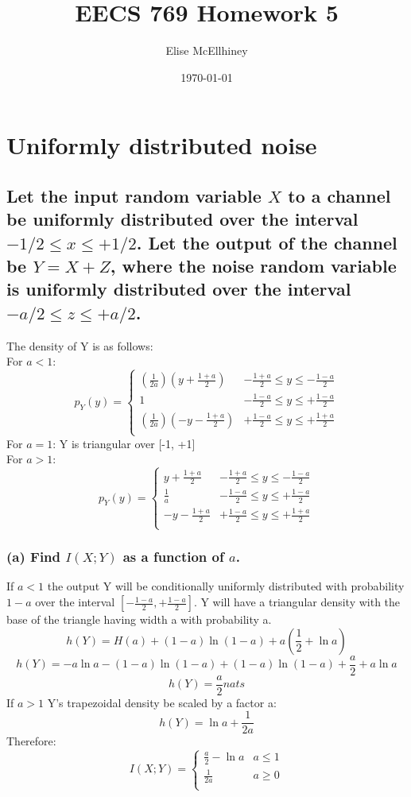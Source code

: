 \documentclass[11pt, oneside]{book}   	%
\title{EECS 769 Homework 5}
\author{Elise McEllhiney}
\date{\today}							%
\begin{document}
\maketitle

\section{Uniformly distributed noise}
\subsection*{Let the input random variable $X$ to a channel be uniformly distributed over the interval $-1/2 \leq x \leq +1/2$.  Let the output of the channel be $Y = X + Z$, where the noise random variable is uniformly distributed over the interval $-a/2 \leq z \leq +a/2$.}
The density of Y is as follows:\\
For $a < 1$:
\[ p_Y(y) =
  \begin{cases} 
      (\frac{1}{2a})(y+\frac{1+a}{2}) & -\frac{1+a}{2} \leq y \leq -\frac{1-a}{2} \\
      1 & -\frac{1-a}{2} \leq y \leq +\frac{1-a}{2} \\
      (\frac{1}{2a})(-y-\frac{1+a}{2}) & +\frac{1-a}{2} \leq y \leq +\frac{1+a}{2} \\
   \end{cases}
\]
For $a = 1$: Y is triangular over [-1, +1]\\
For $a>1$:
\[ p_Y(y) =
  \begin{cases} 
      y+\frac{1+a}{2} & -\frac{1+a}{2} \leq y \leq -\frac{1-a}{2} \\
      \frac{1}{a} & -\frac{1-a}{2} \leq y \leq +\frac{1-a}{2} \\
      -y-\frac{1+a}{2} & +\frac{1-a}{2} \leq y \leq +\frac{1+a}{2} \\
   \end{cases}
\]

\subsubsection{(a) Find $I(X;Y)$ as a function of $a$.}
If $a<1$ the output Y will be conditionally uniformly distributed with probability $1-a$ over the interval $[-\frac{1-a}{2}, +\frac{1-a}{2}]$.  Y will have a triangular density with the base of the triangle having width a with probability a.
$$h(Y) = H(a) + (1-a)\ln(1-a)+a(\frac{1}{2}+\ln{a})$$
$$h(Y) = -a\ln{a} - (1-a)\ln{(1-a)} + (1-a)\ln{(1-a)} + \frac{a}{2} + a\ln{a}$$
$$h(Y) = \frac{a}{2}nats$$
If $a>1$ Y's trapezoidal density be scaled by a factor a:
$$h(Y)=\ln{a}+\frac{1}{2a}$$
Therefore:
\[ I(X;Y) =
  \begin{cases} 
	\frac{a}{2} - \ln{a} & a \leq 1 \\
	\frac{1}{2a} & a \geq 0 \\
   \end{cases}
\]
\end{document}
